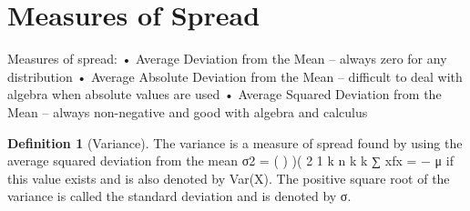 \documentclass[10pt,]{book}
\theoremstyle{plain}
\theoremstyle{definition}
\newtheorem{definition}[theorem]{Definition}
\theoremstyle{definition}
\theoremstyle{definition}
\numberwithin{equation}{section}
\begin{document}
\section[Measures of Spread]{Measures of Spread}\label{section-42}
Measures of spread:
• Average Deviation from the Mean – always zero for any distribution
• Average Absolute Deviation from the Mean – difficult to deal with algebra when absolute values are used
• Average Squared Deviation from the Mean – always non-negative and good with algebra and calculus 
%
\begin{definition}[Variance]\label{definition-32}
The variance is a measure of spread found by using the average squared deviation from the mean
σ2
 = ( ) )(
2
1
k
n
k
k ∑ xfx =
− μ
if this value exists and is also denoted by Var(X). The positive square root of the variance is called the standard deviation
and is denoted by σ. \end{definition}
\end{document}
